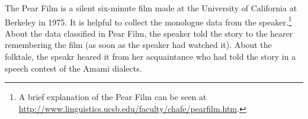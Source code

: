 \begin{table}
\caption{\label{tab:key:2}Data of texts}
\end{table}

The Pear Film is a silent six-minute film made at the University of California at Berkeley in 1975. It is helpful to collect the monologue data from the speaker.\footnote{A brief explanation of the Pear Film can be seen at \url{http://www.linguistics.ucsb.edu/faculty/chafe/pearfilm.htm}.} About the data classified in Pear Film, the speaker told the story to the hearer remembering the film (as soon as the speaker had watched it). About the folktale, the speakr heared it from her acquaintance who had told the story in a speech contest of the Amami dialects.


